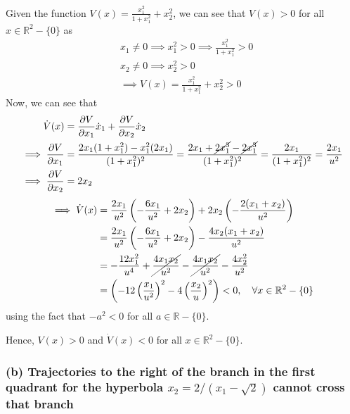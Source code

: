 Given the function \( \displaystyle V(x) = \frac{x_1^2}{1 + x_1^2} + x_2^2 \), we can see that \( V(x) > 0 \) for all \( x \in \mathbb{R}^2 - \{ 0 \} \) as
\begin{align*}
     &
    x_1 \neq 0
    \implies
    x_1^2 > 0
    \implies
    \frac{x_1^2}{1 + x_1^2} > 0
    \\ &
    x_2 \neq 0
    \implies
    x_2^2 > 0
    \\ &
    \implies
    V(x) =
    \frac{x_1^2}{1 + x_1^2} + x_2^2
    > 0
\end{align*}
Now, we can see that
\begin{align*}
    \dot{V}(x)
     & =
    \frac{\partial V}{\partial x_1} \dot{x}_1 + \frac{\partial V}{\partial x_2} \dot{x}_2
    \\
    \implies
    \frac{\partial V}{\partial x_1}
     & =
    \frac{2 x_1 (1 + x_1^2) - x_1^2 (2 x_1)}{(1 + x_1^2)^2}
    =
    \frac{2 x_1 + \cancel{2 x_1^3} - \cancel{2 x_1^3}}{(1 + x_1^2)^2}
    =
    \frac{2 x_1}{(1 + x_1^2)^2}
    =
    \frac{2 x_1}{u^2}
    \\
    \implies
    \frac{\partial V}{\partial x_2}
     & =
    2 x_2
\end{align*}
\begin{align*}
    \implies
    \dot{V}(x)
     & =
    \frac{2 x_1}{u^2} \left( -\frac{6 x_1}{u^2} + 2 x_2 \right) + 2 x_2 \left( -\frac{2 (x_1 + x_2)}{u^2} \right)
    \\ & =
    \frac{2 x_1}{u^2} \left( -\frac{6 x_1}{u^2} + 2 x_2 \right) - \frac{4 x_2 (x_1 + x_2)}{u^2}
    \\ & =
    -\frac{12 x_1^2}{u^4} + \cancel{\frac{4 x_1 x_2}{u^2}} - \cancel{\frac{4 x_1 x_2}{u^2}} - \frac{4 x_2^2}{u^2}
    \\ & =
    \left( -12 \left( \frac{x_1}{u^2} \right)^2 - 4 \left( \frac{x_2}{u} \right)^2 \right)
    <
    0,
    \quad
    \forall x \in \mathbb{R}^2 - \{ 0 \}
\end{align*}
using the fact that \( -a^2 < 0 \) for all \( a \in \mathbb{R} - \{ 0 \} \).

Hence, \( V(x) > 0 \) and \( \dot{V}(x) < 0 \) for all \( x \in \mathbb{R}^2 - \{ 0 \} \).

\subsubsection*{(b) Trajectories to the right of the branch in the first quadrant for the hyperbola \( x_2 = 2 / (x_1 - \sqrt{2}) \) cannot cross that branch}

